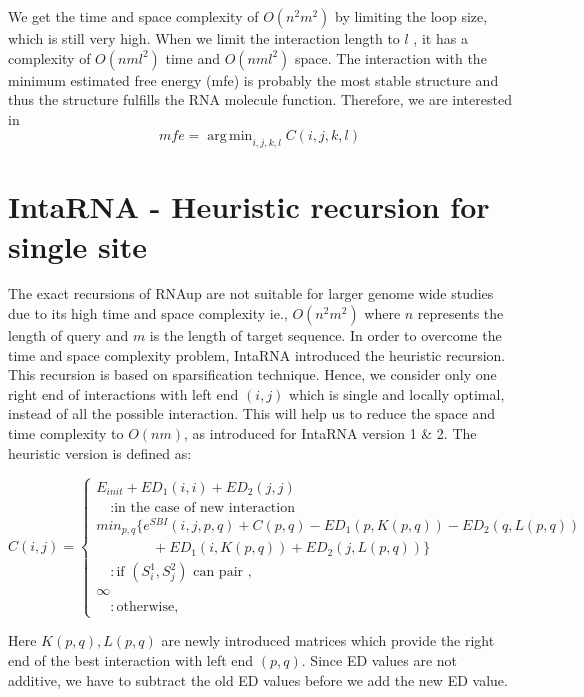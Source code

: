 \documentclass[twoside,a4paper]{report}
\DeclareMathOperator*{\argmin}{arg\,min}
\begin{document}
	We get the time and space complexity of $O(n^2m^2)$ by limiting the loop size, which is still very high. When we limit the interaction length to $l$ , it has a complexity of $O(nml^2)$ time and $O(nml^2)$ space. The interaction with the minimum estimated free energy (mfe) is probably the most stable structure and thus the structure fulfills the RNA molecule function. Therefore, we are interested in \\
	
	 \begin{equation*}
	mfe = \argmin_{i,j,k,l} C(i,j,k,l)
	\end{equation*}

	
	
	\section{IntaRNA -  Heuristic recursion for single site}
	
	The exact recursions of RNAup are not suitable for larger genome wide studies due to its high time and space complexity ie., $O(n^2m^2)$	where $n$ represents the length of query and $m$ is the length of target sequence. In order to overcome the time and space complexity problem, IntaRNA introduced the heuristic recursion. This recursion is based on sparsification technique. Hence, we consider only one right end of interactions with left end $(i, j)$  which is single and locally optimal, instead of all the possible interaction. This will help us to reduce the space and time complexity to $O(nm)$, as introduced for IntaRNA version 1 \& 2. The heuristic version is defined as:
	
	\begin{equation}
	C(i,j) =  \begin{cases}
	E_{init} + ED_1(i, i) + ED_2(j, j) \\
	\quad 	: \text{in the case of new interaction}\\
	min_{p,q}\{ e^{SBI}(i,j,p,q)+ C(p,q) - ED_1(p,K(p,q)) - ED_2(q,L(p,q))\\
	\quad \quad \quad \quad + ED_1(i,K(p,q)) + ED_2(j,L(p,q))\} \\
	\quad 	: \text{if $(S_i^1 , S_j^2 )$ can pair },\\
	\infty \\
	\quad : \text{otherwise},
	\end{cases}
	\end{equation}
	
	Here $K(p,q) , L(p,q)$ are newly introduced matrices which provide the right end of the best interaction with left end $(p,q)$. Since ED values are not additive, we have to subtract the old ED values before we add the new ED value.
	
\end{document}
